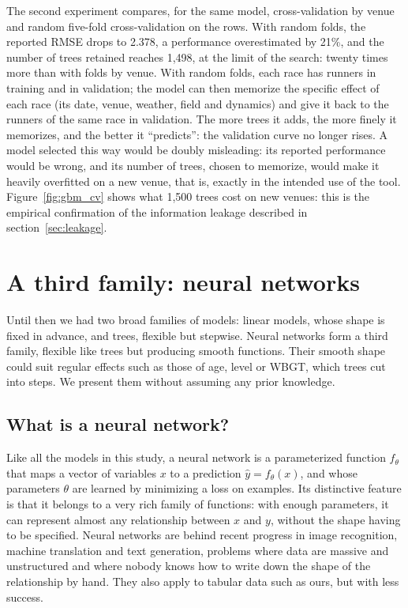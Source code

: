 \documentclass[11pt,a4paper]{article}
\begin{document}
The second experiment compares, for the same model, cross-validation by venue and random five-fold cross-validation on
the rows. With random folds, the reported RMSE drops to 2.378, a performance overestimated by 21\%, and the number of
trees retained reaches 1,498, at the limit of the search: twenty times more than with folds by venue. With random
folds, each race has runners in training and in validation; the model can then memorize the specific effect of each
race (its date, venue, weather, field and dynamics) and give it back to the runners of the same race in validation. The
more trees it adds, the more finely it memorizes, and the better it ``predicts'': the validation curve no longer rises.
A model selected this way would be doubly misleading: its reported performance would be wrong, and its number of
trees, chosen to memorize, would make it heavily overfitted on a new venue, that is, exactly in the intended use of the
tool. Figure~\ref{fig:gbm_cv} shows what 1,500 trees cost on new venues: this is the empirical confirmation of the
information leakage described in section~\ref{sec:leakage}.

\section{A third family: neural networks}\label{sec:networks}

Until then we had two broad families of models: linear models, whose shape is fixed in advance, and trees, flexible
but stepwise. Neural networks form a third family, flexible like trees but producing smooth functions. Their smooth
shape could suit regular effects such as those of age, level or WBGT, which trees cut into steps. We present them
without assuming any prior knowledge.

\subsection{What is a neural network?}\label{sec:mlp}

Like all the models in this study, a neural network is a parameterized function $f_\theta$ that maps a vector of
variables $x$ to a prediction $\hat y = f_\theta(x)$, and whose parameters $\theta$ are learned by minimizing a loss on
examples. Its distinctive feature is that it belongs to a very rich family of functions: with enough parameters, it can
represent almost any relationship between $x$ and $y$, without the shape having to be specified. Neural networks are
behind recent progress in image recognition, machine translation and text generation, problems where data are massive
and unstructured and where nobody knows how to write down the shape of the relationship by hand. They also apply to
tabular data such as ours, but with less success.
\end{document}
